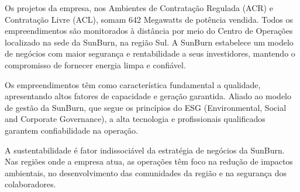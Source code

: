 Os projetos da empresa, nos Ambientes de Contratação Regulada (ACR) e Contratação Livre (ACL), somam 642 Megawatts de potência vendida. Todos os empreendimentos são monitorados à distância por meio do Centro de Operações localizado na sede da SunBurn, na região Sul.
A SunBurn estabelece um modelo de negócios com maior segurança e rentabilidade a seus investidores, mantendo o compromisso de fornecer energia limpa e confiável.

Os empreendimentos têm como característica fundamental a qualidade, apresentando altos fatores de capacidade e geração garantida. Aliado ao modelo de gestão da SunBurn, que segue os princípios do ESG (Environmental, Social and Corporate Governance), a alta tecnologia e profissionais qualificados garantem confiabilidade na operação.

A sustentabilidade é fator indissociável da estratégia de negócios da SunBurn. Nas regiões onde a empresa atua, as operações têm foco na redução de impactos ambientais, no desenvolvimento das comunidades da região e na segurança dos colaboradores.
